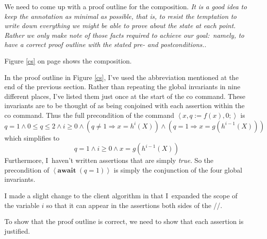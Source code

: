 \documentclass[11pt]{article}%
\begin{document}
We need to come up with a proof outline for the composition. \emph{It is a
good idea to keep the annotation as minimal as possible, that is, to resist
the temptation to write down everything we might be able to prove about the
state at each point. Rather we only make note of those facts required to
achieve our goal:\ namely, to have a correct proof outline with the stated
pre- and postconditions..}

Figure \ref{cs} on page \pageref{cs} shows the composition.

In the proof outline in Figure \ref{cs}, I've used the abbreviation mentioned
at the end of the previous section. Rather than repeating the global
invariants in nine different places, I've listed them just once at the start
of the co command. These invariants are to be thought of as being conjoined
with each assertion within the co command. Thus the full precondition of the
command $\left\langle x,q:=f(x),0;\right\rangle $ is%
\[
q=1\wedge0\leq q\leq2\wedge i\geq0\wedge\left(  q\neq1\Rightarrow
x=h^{i}(X)\right)  \wedge\left(  q=1\Rightarrow x=g(h^{i-1}(X))\right)
\]
which simplifies to%
\[
q=1\wedge i\geq0\wedge x=g(h^{i-1}(X))
\]
Furthermore, I\ haven't written assertions that are simply \textit{true.} So
the precondition of $\left\langle \mathbf{await\;}(q=1)\right\rangle $ is
simply the conjunction of the four global invariants.

I made a slight change to the client algorithm in that I\ expanded the scope
of the variable $i$ so that it can appear in the assertions both sides of the //.

To show that the proof outline is correct, we need to show that each assertion
is justified.
\end{document}
